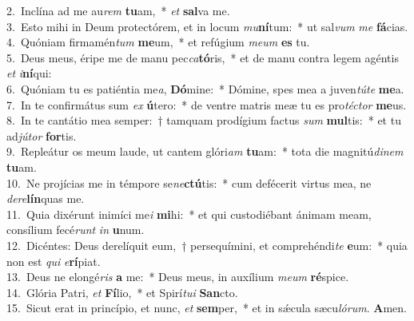 {2.~}Inclína ad me au\textit{rem} \textbf{tu}am,~* \textit{et} \textbf{sal}va me.\\
{3.~}Esto mihi in Deum protectórem, et in locum \textit{mu}\textbf{ní}tum:~* ut sal\textit{vum} \textit{me} \textbf{fá}cias.\\
{4.~}Quóniam firmamén\textit{tum} \textbf{me}um,~* et refúgium \textit{me}\textit{um} \textbf{es} tu.\\
{5.~}Deus meus, éripe me de manu pec\textit{ca}\textbf{tó}ris,~* et de manu contra legem agéntis \textit{et} \textit{i}\textbf{ní}qui:\\
{6.~}Quóniam tu es patiéntia me\textit{a}, \textbf{Dó}mine:~* Dómine, spes mea a juven\textit{tú}\textit{te} \textbf{me}a.\\
{7.~}In te confirmátus sum \textit{ex} \textbf{ú}tero:~* de ventre matris meæ tu es pro\textit{té}\textit{ctor} \textbf{me}us.\\
{8.~}In te cantátio mea semper:~† tamquam prodígium factus \textit{sum} \textbf{mul}tis:~* et tu ad\textit{jú}\textit{tor} \textbf{for}tis.\\
{9.~}Repleátur os meum laude, ut cantem glóri\textit{am} \textbf{tu}am:~* tota die magnitú\textit{di}\textit{nem} \textbf{tu}am.\\
{10.~}Ne projícias me in témpore se\textit{ne}\textbf{ctú}tis:~* cum defécerit virtus mea, ne \textit{de}\textit{re}\textbf{lín}quas me.\\
{11.~}Quia dixérunt inimíci me\textit{i} \textbf{mi}hi:~* et qui custodiébant ánimam meam, consílium fecé\textit{runt} \textit{in} \textbf{u}num.\\
{12.~}Dicéntes: Deus derelíquit eum,~† persequímini, et comprehéndi\textit{te} \textbf{e}um:~* quia non est \textit{qui} \textit{e}\textbf{rí}piat.\\
{13.~}Deus ne elongé\textit{ris} \textbf{a} me:~* Deus meus, in auxílium \textit{me}\textit{um} \textbf{ré}spice.\\
{14.~}Glória Patri, \textit{et} \textbf{Fí}lio,~* et Spirí\textit{tu}\textit{i} \textbf{San}cto.\\
{15.~}Sicut erat in princípio, et nunc, \textit{et} \textbf{sem}per,~* et in sǽcula sæcu\textit{ló}\textit{rum}. \textbf{A}men.\\
